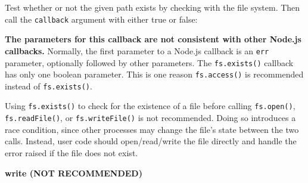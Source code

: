 Test whether or not the given path exists by checking with the file
system. Then call the \texttt{callback} argument with either true or
false:

\begin{Shaded}
\begin{Highlighting}[]
 \OperatorTok{;}

\NormalTok{(}\OperatorTok{,}\KeywordTok{=\textgreater{}}\NormalTok{ \{}
    \OperatorTok{:} \NormalTok{)}\OperatorTok{;}
\NormalTok{\})}\OperatorTok{;}
\end{Highlighting}
\end{Shaded}

\textbf{The parameters for this callback are not consistent with other
Node.js callbacks.} Normally, the first parameter to a Node.js callback
is an \texttt{err} parameter, optionally followed by other parameters.
The \texttt{fs.exists()} callback has only one boolean parameter. This
is one reason \texttt{fs.access()} is recommended instead of
\texttt{fs.exists()}.

Using \texttt{fs.exists()} to check for the existence of a file before
calling \texttt{fs.open()}, \texttt{fs.readFile()}, or
\texttt{fs.writeFile()} is not recommended. Doing so introduces a race
condition, since other processes may change the file's state between the
two calls. Instead, user code should open/read/write the file directly
and handle the error raised if the file does not exist.

\textbf{write (NOT RECOMMENDED)}

